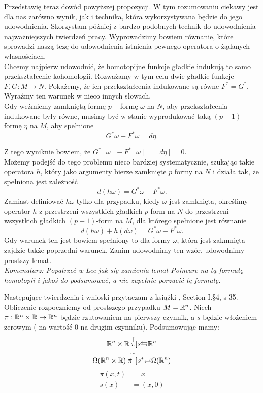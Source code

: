\documentclass[licencjacka]{pracamgr}
\theoremstyle{definition}
\theoremstyle{definition}
\theoremstyle{plain}
\theoremstyle{plain}
\theoremstyle{plain}
\theoremstyle{plain}
\def\R{\ensuremath\mathbb{R}}
\begin{document}
Przedstawię teraz dowód powyższej propozycji.  W tym rozumowaniu ciekawy jest
dla nas zarówno wynik, jak i technika, która wykorzystywana będzie do jego
udowodnienia.  Skorzystam później z bardzo podobnych technik do udowodnienia
najważniejszych twierdzeń pracy.  Wyprowadzimy bowiem równanie, które sprowadzi
naszą tezę do udowodnienia istnienia pewnego operatora o żądanych własnościach.  \\

Chcemy najpierw udowodnić, że homotopijne funkcje gładkie indukują to samo
przekształcenie kohomologii.  Rozważamy w tym celu dwie gładkie funkcje $F, G:
M \rightarrow N$.  Pokażemy, że ich przekształcenia indukowane są równe
$F^\ast = G^\ast$. Wyraźmy ten warunek w nieco innych słowach. \\

Gdy weźmiemy zamkniętą formę $p-$formę $\omega$ na $N$, aby
przekształcenia indukowane były równe, musimy być w stanie
wyprodukować taką $(p-1)$-formę $\eta$ na $M$, aby spełnione
\[
    G^\ast \omega - F^\ast \omega = d\eta.
\]

Z tego wyniknie bowiem, że
$ G^\ast [\omega] - F^\ast [\omega] =
[d\eta] = 0$. \\

Możemy podejść do tego problemu nieco bardziej systematycznie, 
szukając takie operatora
$h$, który jako argumenty bierze zamknięte $p$ formy na $N$
i działa tak, że spełniona jest zależność
\[
    d(h\omega) = G^\ast \omega - F^\ast \omega.
\] 
Zamiast definiować $h \omega$ tylko dla przypadku, kiedy $\omega$
jest zamknięta, określimy operator
$h$ z przestrzeni wszystkich gładkich $p$-form na $N$
do przestrzeni wszystkich gładkich $(p-1)$-form na $M$,
dla którego spełnione jest równanie
\begin{equation}\label{homotopy-formula}
    d(h\omega) + h(d\omega) = G^\ast \omega - F^\ast \omega.
\end{equation}
Gdy warunek ten jest bowiem spełniony to dla formy $\omega$, która
jest zakmnięta zajdzie także poprzedni warunek.  Zanim udowodnimy
ten wzór, udowodnimy prostszy lemat. \\

\emph{Komenatarz: Popatrzeć w Lee jak się zamienia lemat Poincare na tą formułę
homotopii i jakoś do podsumować, a nie zupełnie porzucić tę formułę.}

Następujące twierdzenia i wnioski przytaczam z książki \cite{bott}, Section
I.\S4, s 35. \\


Obliczenie rozpoczniemy od prostszego przypadku $M = \R^n$.
Niech $\pi: \R^n \times \R \rightarrow \R^n$  będzie rzutowaniem
na pierwszy czynnik, a $s$  będzie włożeniem zerowym (
na wartość $0$ na drugim czynniku). Podsumowując mamy:
\[
 \R^n \times \R
 \stackrel[\pi]{s}{\leftrightarrows} 
 \R^n
\]
\[
 \Omega (\R^n \times \R)
 \stackrel[\pi^\ast]{s^\ast}{\rightleftarrows} 
 \Omega(\R^n)
\]
\begin{align*}
    \pi(x, t) &= x \\
         s(x) &= (x, 0)
\end{align*}
\end{document}
